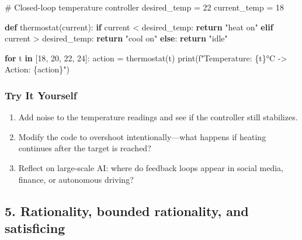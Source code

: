 \documentclass[
  letterpaper,
  DIV=11,
  numbers=noendperiod]{scrreprt}
\newenvironment{Shaded}{\begin{snugshade}}{\end{snugshade}}
\newcommand{\BuiltInTok}[1]{\textcolor[rgb]{0.00,0.23,0.31}{#1}}
\newcommand{\CommentTok}[1]{\textcolor[rgb]{0.37,0.37,0.37}{#1}}
\newcommand{\ControlFlowTok}[1]{\textcolor[rgb]{0.00,0.23,0.31}{\textbf{#1}}}
\newcommand{\DecValTok}[1]{\textcolor[rgb]{0.68,0.00,0.00}{#1}}
\newcommand{\KeywordTok}[1]{\textcolor[rgb]{0.00,0.23,0.31}{\textbf{#1}}}
\newcommand{\NormalTok}[1]{\textcolor[rgb]{0.00,0.23,0.31}{#1}}
\newcommand{\OperatorTok}[1]{\textcolor[rgb]{0.37,0.37,0.37}{#1}}
\newcommand{\SpecialCharTok}[1]{\textcolor[rgb]{0.37,0.37,0.37}{#1}}
\newcommand{\SpecialStringTok}[1]{\textcolor[rgb]{0.13,0.47,0.30}{#1}}
\newcommand{\StringTok}[1]{\textcolor[rgb]{0.13,0.47,0.30}{#1}}
\providecommand{\tightlist}{%
  \setlength{\itemsep}{0pt}\setlength{\parskip}{0pt}}
\begin{document}
\begin{Shaded}
\begin{Highlighting}[]
\CommentTok{\# Closed{-}loop temperature controller}
\NormalTok{desired\_temp }\OperatorTok{=} \DecValTok{22}
\NormalTok{current\_temp }\OperatorTok{=} \DecValTok{18}

\KeywordTok{def}\NormalTok{ thermostat(current):}
    \ControlFlowTok{if}\NormalTok{ current }\OperatorTok{\textless{}}\NormalTok{ desired\_temp:}
        \ControlFlowTok{return} \StringTok{"heat on"}
    \ControlFlowTok{elif}\NormalTok{ current }\OperatorTok{\textgreater{}}\NormalTok{ desired\_temp:}
        \ControlFlowTok{return} \StringTok{"cool on"}
    \ControlFlowTok{else}\NormalTok{:}
        \ControlFlowTok{return} \StringTok{"idle"}

\ControlFlowTok{for}\NormalTok{ t }\KeywordTok{in}\NormalTok{ [}\DecValTok{18}\NormalTok{, }\DecValTok{20}\NormalTok{, }\DecValTok{22}\NormalTok{, }\DecValTok{24}\NormalTok{]:}
\NormalTok{    action }\OperatorTok{=}\NormalTok{ thermostat(t)}
    \BuiltInTok{print}\NormalTok{(}\SpecialStringTok{f"Temperature: }\SpecialCharTok{\{}\NormalTok{t}\SpecialCharTok{\}}\SpecialStringTok{°C {-}\textgreater{} Action: }\SpecialCharTok{\{}\NormalTok{action}\SpecialCharTok{\}}\SpecialStringTok{"}\NormalTok{)}
\end{Highlighting}
\end{Shaded}

\subsubsection{Try It Yourself}\label{try-it-yourself-3}

\begin{enumerate}
\def\labelenumi{\arabic{enumi}.}
\tightlist
\item
  Add noise to the temperature readings and see if the controller still
  stabilizes.
\item
  Modify the code to overshoot intentionally---what happens if heating
  continues after the target is reached?
\item
  Reflect on large-scale AI: where do feedback loops appear in social
  media, finance, or autonomous driving?
\end{enumerate}

\subsection{5. Rationality, bounded rationality, and
satisficing}\label{rationality-bounded-rationality-and-satisficing}
\end{document}

